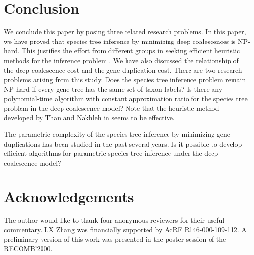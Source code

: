 \documentclass[9.5pt,journal,letterpaper,compsoc]{IEEEtran}
\begin{document}
\section{Conclusion}

We conclude this paper by posing three related research problems. In
this paper, we have proved that species tree inference by minimizing
deep coalescences is NP-hard. This justifies the effort from
different groups in seeking efficient heuristic methods for the
inference problem \cite{Maddison_SysBiol_06, Tran_PlosCB_09}. We
have also discussed the relationship of the deep coalescence cost
and the gene duplication cost. There are two research problems arising
 from this study. Does the species tree inference problem remain NP-hard if
every gene tree has the same set of taxon labels? Is there any
polynomial-time algorithm with constant approximation ratio for the
species tree problem in the deep coalescence model? Note that the
heuristic method developed by Than and Nakhleh in
\cite{Tran_PlosCB_09} seems to be effective.

The parametric complexity of the species tree inference by
minimizing gene  duplications has been studied in the past several
years. Is it possible to develop efficient algorithms for parametric
species tree inference under the deep coalescence model?






\section*{Acknowledgements}

The author would like to thank four anonymous reviewers for their
useful commentary. LX Zhang was financially supported
by AcRF R146-000-109-112. A
preliminary version of this work was presented in the poster session
of the RECOMB'2000.
\end{document}
